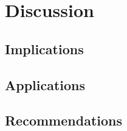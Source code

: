 \chapter{Discussion\label{cha:discussion}}

\section{Implications}

\section{Applications}

\section{Recommendations}
